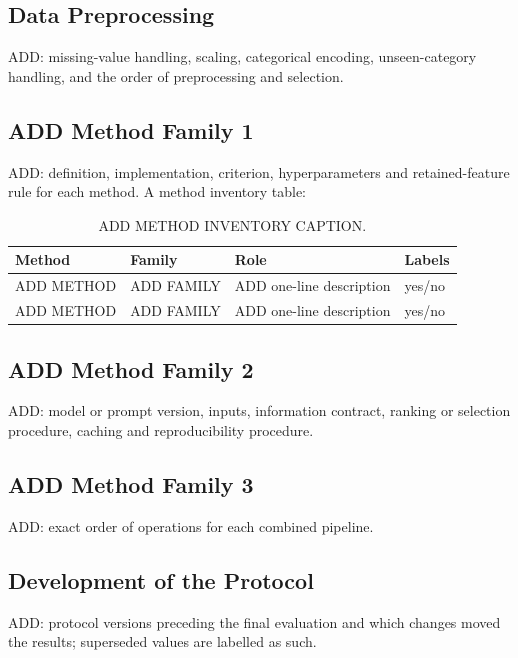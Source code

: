 \documentclass[final,5p,twocolumn]{elsarticle}
\begin{document}
\subsection{Data Preprocessing}
\label{subsec:preprocessing}
ADD: missing-value handling, scaling, categorical encoding, unseen-category handling, and the order of preprocessing and selection.

\subsection{ADD Method Family 1}
\label{subsec:method_family_1}
ADD: definition, implementation, criterion, hyperparameters and retained-feature rule for each method. A method inventory table:

\begin{table}[htbp]
\centering
\footnotesize
\begin{threeparttable}
\caption{ADD METHOD INVENTORY CAPTION.}
\label{tab:methods}
\begin{tabular}{@{}llL{95mm}l@{}}
\toprule
Method & Family & Role & Labels \\
\midrule
ADD METHOD & ADD FAMILY & ADD one-line description & yes/no \\
ADD METHOD & ADD FAMILY & ADD one-line description & yes/no \\
\bottomrule
\end{tabular}
\end{threeparttable}
\end{table}

\subsection{ADD Method Family 2}
\label{subsec:method_family_2}
ADD: model or prompt version, inputs, information contract, ranking or selection procedure, caching and reproducibility procedure.

\subsection{ADD Method Family 3}
\label{subsec:method_family_3}
ADD: exact order of operations for each combined pipeline.

\subsection{Development of the Protocol}
\label{subsec:protocol_development}
ADD: protocol versions preceding the final evaluation and which changes moved the results; superseded values are labelled as such.
\end{document}
